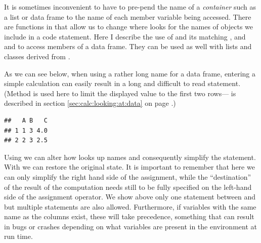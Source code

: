 \documentclass[krantz2]{krantz}\usepackage{knitr}%
\begin{document}
\begin{explainbox}
It is sometimes inconvenient to have to pre-pend the name of a \emph{container} such as a list or data frame to the name of each member variable being accessed. There are functions in \Rlang that allow us to change where \Rlang looks for the names of objects we include in a code statement. Here I describe the use of  and its matching , and  and  to access members of a data frame. They can be used as well with lists and classes derived from .

As we can see below, when using a rather long name for a data frame, entering a simple calculation can easily result in a long and difficult to read statement. (Method  is used here to limit the displayed value to the first two rows--- is described in section \ref{sec:calc:looking:at:data} on page \pageref{sec:calc:looking:at:data}.)

\begin{knitrout}\footnotesize
{}\color{fgcolor}\begin{kframe}
\begin{alltt}
 \hlkwb{<-} \hlstd{(} \hlstd{=} \hlopt{:}\hlstd{,}  \hlstd{=} \hlstd{)}
\hlopt{$} \hlkwb{<-}
  \hlopt{$} \hlopt{+} \hlopt{$} \hlopt{/} \hlopt{$}
 \hlstd{)}
\end{alltt}
\begin{verbatim}
##   A B   C
## 1 1 3 4.0
## 2 2 3 2.5
\end{verbatim}
\end{kframe}
\end{knitrout}

Using  we can alter how \Rlang looks up names and consequently simplify the statement. With  we can restore the original state. It is important to remember that here we can only simplify the right hand side of the assignment, while the ``destination'' of the result of the computation needs still to be fully specified on the left-hand side of the assignment operator. We show above only one statement between  and  but multiple statements are also allowed. Furthermore, if variables with the same name as the columns exist, these will take precedence, something that can result in bugs or crashes depending on what variables are present in the \Rlang environment at run time.


\end{explainbox}
\end{document}
